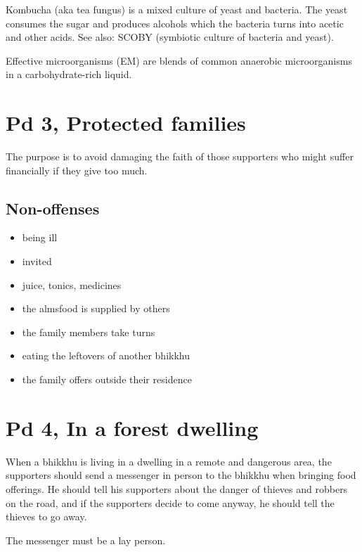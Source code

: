 Kombucha (aka tea fungus) is a mixed culture of yeast and bacteria. The
yeast consumes the sugar and produces alcohols which the bacteria turns
into acetic and other acids. See also: SCOBY (symbiotic culture of
bacteria and yeast).

Effective microorganisms (EM) are blends of common anaerobic
microorganisms in a carbohydrate-rich liquid.

\clearpage

\section{Pd 3, Protected families}

The purpose is to avoid damaging the faith of those supporters who might
suffer financially if they give too much.

\subsection{Non-offenses}

\begin{multicols}{2}

\begin{itemize}
\tightlist
\item
  being ill
\item
  invited
\item
  juice, tonics, medicines
\item
  the almsfood is supplied by others
\item
  the family members take turns
\item
  eating the leftovers of another bhikkhu
\item
  the family offers outside their residence
\end{itemize}

\end{multicols}

\section{Pd 4, In a forest dwelling}

When a bhikkhu is living in a dwelling in a remote and dangerous area,
the supporters should send a messenger in person to the bhikkhu when
bringing food offerings. He should tell his supporters about the danger
of thieves and robbers on the road, and if the supporters decide to come
anyway, he should tell the thieves to go away.

The messenger must be a lay person.

